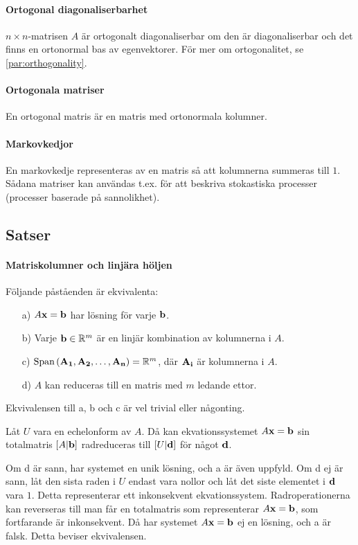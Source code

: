 \paragraph{Ortogonal diagonaliserbarhet}
$n\times n$-matrisen $A$ är ortogonalt diagonaliserbar om den är diagonaliserbar och det finns en ortonormal bas av egenvektorer. För mer om ortogonalitet, se \ref{par:orthogonality}.

\paragraph{Ortogonala matriser}
En ortogonal matris är en matris med ortonormala kolumner.

\paragraph{Markovkedjor}
En markovkedje representeras av en matris så att kolumnerna summeras till $1$. Sådana matriser kan användas t.ex. för att beskriva stokastiska processer (processer baserade på sannolikhet).

\subsection{Satser}

\paragraph{Matriskolumner och linjära höljen}
Följande påståenden är ekvivalenta:
\begin{itemize}
	\item[a)] $A\vect{x} = \vect{b}$ har lösning för varje $\vect{b}$.
	\item[b)] Varje $\vect{b}\in \R^{m}$ är en linjär kombination av kolumnerna i $A$.
	\item[c)] $\Span{\vect{A_1}, \vect{A_2}, \dots, \vect{A_n}} = \R^m$, där $\vect{A_i}$ är kolumnerna i $A$.
	\item[d)] $A$ kan reduceras till en matris med $m$ ledande ettor.
\end{itemize}

\proof
Ekvivalensen till a, b och c är vel trivial eller någonting.

Låt $U$ vara en echelonform av $A$. Då kan ekvationssystemet $A\vect{x} = \vect{b}$ sin totalmatris $[A | \vect{b}]$ radreduceras till $[U | \vect{d}]$ för något $\vect{d}$.

Om d är sann, har systemet en unik lösning, och a är även uppfyld. Om d ej är sann, låt den sista raden i $U$ endast vara nollor och låt det siste elementet i $\vect{d}$ vara $1$. Detta representerar ett inkonsekvent ekvationssystem. Radroperationerna kan reverseras till man får en totalmatris som representerar $A\vect{x} = \vect{b}$, som fortfarande är inkonsekvent. Då har systemet $A\vect{x} = \vect{b}$ ej en lösning, och a är falsk. Detta beviser ekvivalensen.

